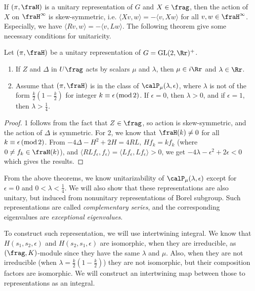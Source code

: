 If $(\pi, \fraH)$ is a unitary representation of $G$ and  $X\in \frag$, then the action of $X$ on $\fraH^{\infty}$ is skew-symmetric, i.e. $\langle Xv, w\rangle = -\langle v, Xw\rangle$ for all $v, w\in \fraH^{\infty}$.  
Especially, we have $\langle Rv, w\rangle = -\langle v, Lw\rangle$. 
The following theorem give some necessary conditions for unitaricity. 
\begin{theorem}
Let $(\pi, \fraH)$ be a unitary representation of $G = \GL(2, \Rr)^{+}$. 
\begin{enumerate}
\item If $Z$ and $\Delta$ in $U\frag$ acts by scalars $\mu$ and $\lambda$, then $\mu\in i\Rr$ and $\lambda\in \Rr$. 
\item Assume that $(\pi, \fraH)$ is in the class of $\calP_{\mu}(\lambda, \epsilon)$, where $\lambda$ is not of the form $\frac{k}{2}\left(1-\frac{k}{2}\right)$ for integer $k\equiv \epsilon\,(\mathrm{mod}\,2)$. If $\epsilon = 0$, then $\lambda > 0$, and if $\epsilon = 1$, then $\lambda > \frac{1}{4}$. 
\end{enumerate}
\end{theorem}
\begin{proof}
1 follows from the fact that $Z\in \frag$, so action is skew-symmetric, and the action of $\Delta$ is symmetric. For 2, we know that $\fraH(k)\neq 0$ for all $k\equiv\epsilon\,(\mathrm{mod}\,2)$. From $-4\Delta - H^{2} + 2H = 4RL$, $Hf_{k} = kf_{k}$ (where $0\neq f_{k}\in \fraH(k)$), and $\langle RL f_{\epsilon}, f_{\epsilon}\rangle = \langle Lf_{\epsilon}, Lf_{\epsilon}\rangle  >0$, we get $-4\lambda - \epsilon^{2} + 2\epsilon <0$ which gives the results. 
\end{proof}

From the above theorems, we know unitarizability of $\calP_{\mu}(\lambda, \epsilon)$ except for $\epsilon = 0$ and $0 < \lambda < \frac{1}{4}$. We will also show that these representations are also unitary, but induced from nonunitary representations of Borel subgroup. Such representations are called \emph{complementary series}, and the corresponding eigenvalues are \emph{exceptional eigenvalues}. 

To construct such representation, we will use intertwining integral. We know that $H(s_{1}, s_{2}, \epsilon)$ and $H(s_{2}, s_{1}, \epsilon)$ are isomorphic, when they are irreducible,  as $(\frag, K)$-module since they have the same $\lambda$ and $\mu$. 
Also, when they are not irreducible (when $\lambda = \frac{k}{2}\left(1-\frac{k}{2}\right)$) they are not isomorphic, but their composition factors are isomorphic. 
We will construct an intertwining map between those to representations as an integral. 

